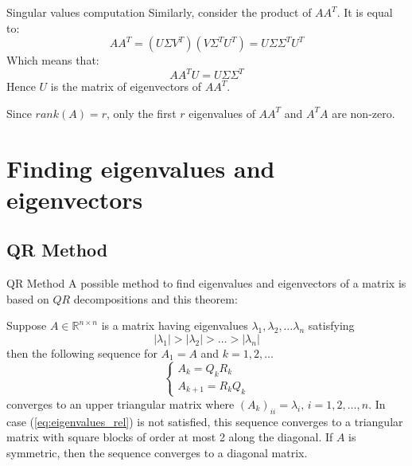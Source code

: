 \documentclass[10pt]{beamer}
\begin{document}
\begin{frame}{Singular values computation}
    Similarly, consider the product of $A A^T$. It is equal to:
    $$ A A^T = (U \Sigma V^T)( V \Sigma^T U^T ) = U \Sigma \Sigma^T U^T$$
    Which means that:
    $$ AA^T U = U \Sigma \Sigma^T $$
    Hence $U$ is the matrix of eigenvectors of $AA^T$. \bigskip

    Since $rank(A) = r$, only the first $r$ eigenvalues of $AA^T$ and $A^T A$ are non-zero.
\end{frame}

\section{Finding eigenvalues and eigenvectors}
\subsection{QR Method}

\begin{frame}{QR Method}
    A possible method to find eigenvalues and eigenvectors of a matrix is based on $QR$ decompositions and this theorem:
    \begin{theorem}
        Suppose $A \in \mathbb{R}^{n \times n}$ is a matrix having eigenvalues $\lambda_1, \lambda_2, \ldots \lambda_n$ satisfying 
        \begin{equation}
            \label{eq:eigenvalues_rel}
            \left\lvert \lambda_1 \right\rvert > \left\lvert \lambda_2 \right\rvert > \ldots > \left\lvert \lambda_n \right\rvert
        \end{equation}
        then the following sequence for $A_1 = A$ and $k = 1, 2, \ldots$
        \begin{equation}
            \label{eq:A_sequence}
            \begin{cases}
                A_k = Q_k R_k \\
                A_{k+1} = R_k Q_k 
            \end{cases} 
        \end{equation}
        converges to an upper triangular matrix where $(A_k)_{ii} = \lambda_i, \, i = 1, 2, \ldots, n$.
        In case (\ref{eq:eigenvalues_rel}) is not satisfied, this sequence converges to a triangular matrix with square blocks of order at most 2 along the diagonal. \newline
        If $A$ is symmetric, then the sequence converges to a diagonal matrix. 
    \end{theorem}
\end{frame}
\end{document}
